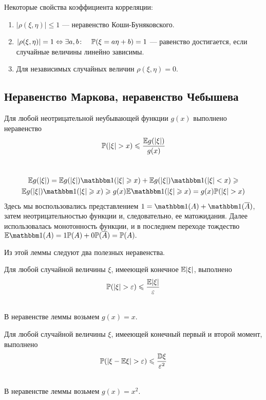 \documentclass[../TV&MS.tex]{subfiles}
\begin{document}
Некоторые свойства коэффициента корреляции:
\begin{enumerate}
	\item $|\rho(\xi, \eta)| \le 1$ --- неравенство Коши-Буняковского.
	\item $|\rho(\xi, \eta)| = 1 \Leftrightarrow \exists a, b \colon 
	\quad \mathbb{P}(\xi = a\eta + b) = 1$ --- равенство достигается, 
	если случайные величины линейно зависимы.
	
	\item Для независимых случайных величин $\rho(\xi, \eta) = 0$.
\end{enumerate} 


\subsection{Неравенство Маркова, неравенство Чебышева}
\begin{Lem}
Для любой неотрицательной неубывающей функции $g(x)$ выполнено неравенство 
$$\mathbb{P}(|\xi| > x) \leqslant \frac{\mathbb{E} g(|\xi|)}{g(x)}$$
\end{Lem}
\begin{Proof} \\
\begin{multline*}
    \Expec g(|\xi|) = \Expec g(|\xi|) \Ind(|\xi| \geqslant x) +
    \Expec g(|\xi|) \Ind(|\xi| < x) \geqslant \\
    \Expec g(|\xi|) \Ind(|\xi| \geqslant x) \geqslant 
    g(x)\Expec\Ind(|\xi| \geqslant x) = g(x)\Pro(|\xi| > x)
\end{multline*}
Здесь мы воспользовались представлением $1 = \Ind(A) + \Ind(\overline{A})$, 
затем неотрицательностью функции и, следовательно, ее матожидания. 
Далее использовалась монотонность функции, и в последнем переходе тождество 
$\Expec \Ind(A) = 1 \Pro(A) + 0 \Pro(\overline{A}) = \Pro(A).$
\end{Proof}

Из этой леммы следуют два полезных неравенства.

\begin{Th} 
Для любой случайной величины $\xi$, имееющей конечное $\mathbb{E}|\xi|$, выполнено
$$\mathbb{P}(|\xi| > \varepsilon) \leqslant \frac{\mathbb{E}|\xi|}{\varepsilon}$$
\end{Th}
\begin{Proof}\\
В неравенстве леммы возьмем $g(x) = x$.
\end{Proof}

\begin{Th} 
Для любой случайной величины $\xi$, имееющей конечный первый и второй момент, выполнено
$$\mathbb{P}(|\xi - \mathbb{E}\xi| > \varepsilon) \leqslant \frac{\mathbb{D}\xi}{\varepsilon^2}$$
\end{Th}
\begin{Proof}\\
В неравенстве леммы возьмем $g(x) = x^2$.
\end{Proof}


\newpage
\end{document}
